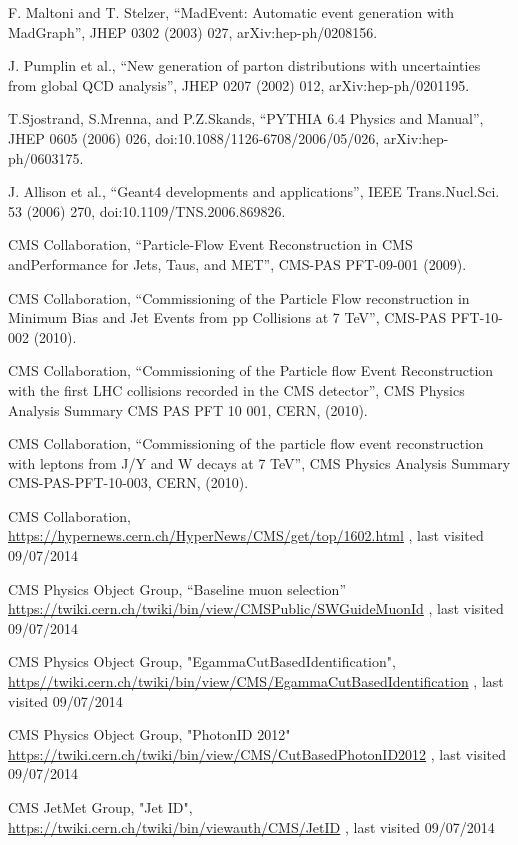 \documentclass[12pt,oneandhalf,chaparabic,phys,ms,eng]{metu}
\begin{document}
\begin{thebibliography}{99}
	F. Maltoni and T. Stelzer, “MadEvent: Automatic event generation with MadGraph”, JHEP 0302 (2003) 027, arXiv:hep-ph/0208156.

	J. Pumplin et al., “New generation of parton distributions with uncertainties from global QCD analysis”, JHEP 0207 (2002) 012, arXiv:hep-ph/0201195.

	T.Sjostrand, S.Mrenna, and P.Z.Skands, “PYTHIA 6.4 Physics and Manual”, JHEP 0605 (2006) 026, doi:10.1088/1126-6708/2006/05/026, arXiv:hep-ph/0603175.

	J. Allison et al., “Geant4 developments and applications”, IEEE Trans.Nucl.Sci. 53 (2006)
270, doi:10.1109/TNS.2006.869826.

	CMS Collaboration, “Particle-Flow Event Reconstruction in CMS andPerformance for Jets, Taus, and MET”, CMS-PAS PFT-09-001 (2009).

	CMS Collaboration, “Commissioning of the Particle Flow reconstruction in Minimum Bias and Jet Events from pp Collisions at 7 TeV”, CMS-PAS PFT-10-002 (2010).

	CMS Collaboration, “Commissioning of the Particle flow Event Reconstruction with the first LHC collisions recorded in the CMS detector”, CMS Physics Analysis Summary CMS PAS PFT 10 001, CERN, (2010).

	CMS Collaboration, “Commissioning of the particle flow event reconstruction with leptons from J/Y and W decays at 7 TeV”, CMS Physics Analysis Summary CMS-PAS-PFT-10-003, CERN, (2010).

	CMS Collaboration, \url{https://hypernews.cern.ch/HyperNews/CMS/get/top/1602.html} , last visited 09/07/2014

	CMS Physics Object Group, “Baseline muon selection” \url{https://twiki.cern.ch/twiki/bin/view/CMSPublic/SWGuideMuonId} , last visited 09/07/2014

	CMS Physics Object Group, "EgammaCutBasedIdentification",  \url{https//twiki.cern.ch/twiki/bin/view/CMS/EgammaCutBasedIdentification} , last visited 09/07/2014

	 CMS Physics Object Group, "PhotonID 2012" \url{https://twiki.cern.ch/twiki/bin/view/CMS/CutBasedPhotonID2012} , last visited 09/07/2014

 CMS JetMet Group, "Jet ID", \url{https://twiki.cern.ch/twiki/bin/viewauth/CMS/JetID} , last visited 09/07/2014


\end{thebibliography}
\end{document}
